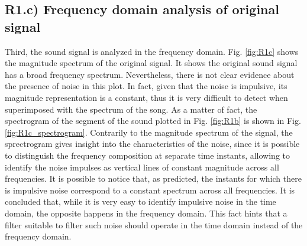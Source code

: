 \documentclass[a4paper, oneside, 11pt]{article}
\begin{document}
\subsection{R1.c) Frequency domain analysis of original signal}
Third, the sound signal is analyzed in the frequency domain. Fig. \ref{fig:R1c} shows the magnitude spectrum of the original signal. It shows the original sound signal has a broad frequency spectrum. Nevertheless, there is not clear evidence about the presence of noise in this plot. In fact, given that the noise is impulsive, its magnitude representation is a constant, thus it is very difficult to detect when superimposed with the spectrum of the song. As a matter of fact, the spectrogram of the segment of the sound plotted in Fig. \ref{fig:R1b} is shown in Fig. \ref{fig:R1c_spectrogram}. Contrarily to the magnitude spectrum of the signal, the sprectrogram gives insight into the characteristics of the noise, since it is possible to distinguish the frequency composition at separate time instants, allowing to identify the noise impulses as vertical lines of constant magnitude across all frequencies. It is possible to notice that, as predicted, the instants for which there is impulsive noise correspond to a constant spectrum across all frequencies. It is concluded that, while it is very easy to identify impulsive noise in the time domain, the opposite happens in the frequency domain. This fact hints that a filter suitable to filter such noise should operate in the time domain instead of the frequency domain.

\end{document}
